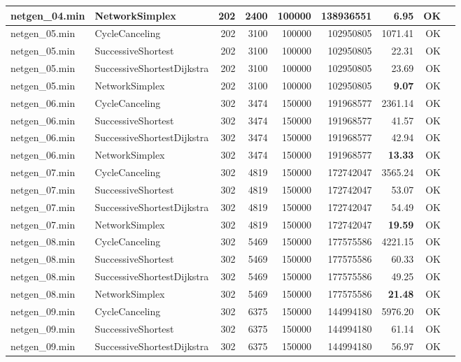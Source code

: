 \begin{longtable}{llrrrrrrl}
netgen\_04.min & NetworkSimplex & 202 & 2400 & 100000 & 138936551 & \textbf{6.95} & OK \\
\midrule
netgen\_05.min & CycleCanceling & 202 & 3100 & 100000 & 102950805 & 1071.41 & OK \\
netgen\_05.min & SuccessiveShortest & 202 & 3100 & 100000 & 102950805 & 22.31 & OK \\
netgen\_05.min & SuccessiveShortestDijkstra & 202 & 3100 & 100000 & 102950805 & 23.69 & OK \\
netgen\_05.min & NetworkSimplex & 202 & 3100 & 100000 & 102950805 & \textbf{9.07} & OK \\
\midrule
netgen\_06.min & CycleCanceling & 302 & 3474 & 150000 & 191968577 & 2361.14 & OK \\
netgen\_06.min & SuccessiveShortest & 302 & 3474 & 150000 & 191968577 & 41.57 & OK \\
netgen\_06.min & SuccessiveShortestDijkstra & 302 & 3474 & 150000 & 191968577 & 42.94 & OK \\
netgen\_06.min & NetworkSimplex & 302 & 3474 & 150000 & 191968577 & \textbf{13.33} & OK \\
\midrule
netgen\_07.min & CycleCanceling & 302 & 4819 & 150000 & 172742047 & 3565.24 & OK \\
netgen\_07.min & SuccessiveShortest & 302 & 4819 & 150000 & 172742047 & 53.07 & OK \\
netgen\_07.min & SuccessiveShortestDijkstra & 302 & 4819 & 150000 & 172742047 & 54.49 & OK \\
netgen\_07.min & NetworkSimplex & 302 & 4819 & 150000 & 172742047 & \textbf{19.59} & OK \\
\midrule
netgen\_08.min & CycleCanceling & 302 & 5469 & 150000 & 177575586 & 4221.15 & OK \\
netgen\_08.min & SuccessiveShortest & 302 & 5469 & 150000 & 177575586 & 60.33 & OK \\
netgen\_08.min & SuccessiveShortestDijkstra & 302 & 5469 & 150000 & 177575586 & 49.25 & OK \\
netgen\_08.min & NetworkSimplex & 302 & 5469 & 150000 & 177575586 & \textbf{21.48} & OK \\
\midrule
netgen\_09.min & CycleCanceling & 302 & 6375 & 150000 & 144994180 & 5976.20 & OK \\
netgen\_09.min & SuccessiveShortest & 302 & 6375 & 150000 & 144994180 & 61.14 & OK \\
netgen\_09.min & SuccessiveShortestDijkstra & 302 & 6375 & 150000 & 144994180 & 56.97 & OK \\

\end{longtable}
